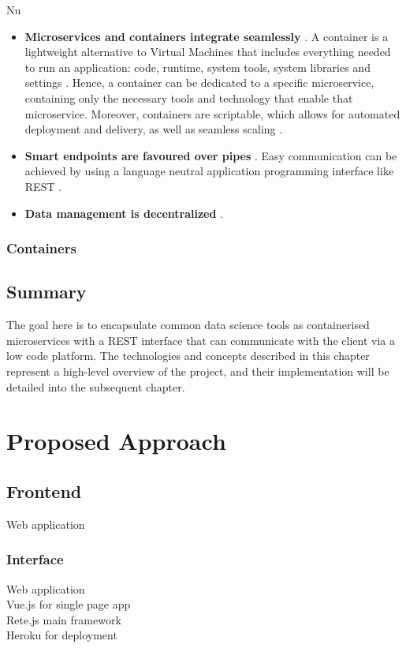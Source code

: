 Nu\documentclass[11pt,twoside, a4paper]{report}
\begin{document}
\begin{itemize}
    \item \textbf{Microservices and containers integrate seamlessly} \parencite{Mazzara2017}.
    A container is a lightweight alternative to Virtual Machines \cite{Bernstein2014} that includes everything needed to run an application: code, runtime, system tools, system libraries and settings \parencite{whatisacontainer}. Hence, a container can be dedicated to a specific microservice, containing only the necessary tools and technology that enable that microservice. Moreover, containers are scriptable, which allows for automated deployment and delivery, as well as seamless scaling \parencite{Sarita2018}.
    \item \textbf{Smart endpoints are favoured over pipes} \parencite{FowlerMicroservices}.
    Easy communication can be achieved by using a language neutral application programming interface like REST \parencite{Jaramillo2016}. 
    \item \textbf{Data management is decentralized} \parencite{FowlerMicroservices}.
\end{itemize}
\subsection{Containers}

\section{Summary}

The goal here is to encapsulate common data science tools as containerised microservices with a REST interface that can communicate with the client via a low code platform. The technologies and concepts described in this chapter represent a high-level overview of the project, and their implementation will be detailed into the subsequent chapter.

\chapter{Proposed Approach}

\section{Frontend}
Web application \\

\subsection{Interface}
Web application \\
Vue.js for single page app \\
Rete.js main framework \\
Heroku for deployment\\
\end{document}
